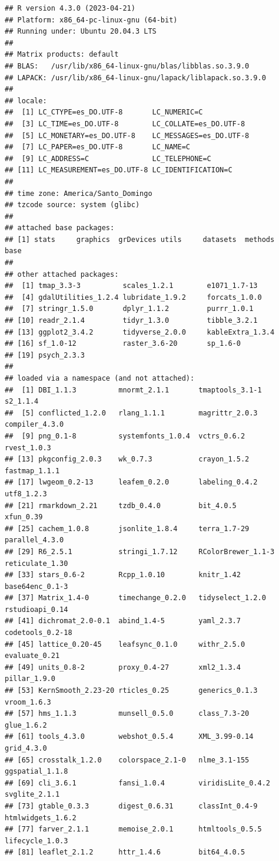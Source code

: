 \documentclass[spanish]{article}
\begin{document}
\begin{verbatim}
## R version 4.3.0 (2023-04-21)
## Platform: x86_64-pc-linux-gnu (64-bit)
## Running under: Ubuntu 20.04.3 LTS
## 
## Matrix products: default
## BLAS:   /usr/lib/x86_64-linux-gnu/blas/libblas.so.3.9.0 
## LAPACK: /usr/lib/x86_64-linux-gnu/lapack/liblapack.so.3.9.0
## 
## locale:
##  [1] LC_CTYPE=es_DO.UTF-8       LC_NUMERIC=C              
##  [3] LC_TIME=es_DO.UTF-8        LC_COLLATE=es_DO.UTF-8    
##  [5] LC_MONETARY=es_DO.UTF-8    LC_MESSAGES=es_DO.UTF-8   
##  [7] LC_PAPER=es_DO.UTF-8       LC_NAME=C                 
##  [9] LC_ADDRESS=C               LC_TELEPHONE=C            
## [11] LC_MEASUREMENT=es_DO.UTF-8 LC_IDENTIFICATION=C       
## 
## time zone: America/Santo_Domingo
## tzcode source: system (glibc)
## 
## attached base packages:
## [1] stats     graphics  grDevices utils     datasets  methods   base     
## 
## other attached packages:
##  [1] tmap_3.3-3          scales_1.2.1        e1071_1.7-13       
##  [4] gdalUtilities_1.2.4 lubridate_1.9.2     forcats_1.0.0      
##  [7] stringr_1.5.0       dplyr_1.1.2         purrr_1.0.1        
## [10] readr_2.1.4         tidyr_1.3.0         tibble_3.2.1       
## [13] ggplot2_3.4.2       tidyverse_2.0.0     kableExtra_1.3.4   
## [16] sf_1.0-12           raster_3.6-20       sp_1.6-0           
## [19] psych_2.3.3        
## 
## loaded via a namespace (and not attached):
##  [1] DBI_1.1.3          mnormt_2.1.1       tmaptools_3.1-1    s2_1.1.4          
##  [5] conflicted_1.2.0   rlang_1.1.1        magrittr_2.0.3     compiler_4.3.0    
##  [9] png_0.1-8          systemfonts_1.0.4  vctrs_0.6.2        rvest_1.0.3       
## [13] pkgconfig_2.0.3    wk_0.7.3           crayon_1.5.2       fastmap_1.1.1     
## [17] lwgeom_0.2-13      leafem_0.2.0       labeling_0.4.2     utf8_1.2.3        
## [21] rmarkdown_2.21     tzdb_0.4.0         bit_4.0.5          xfun_0.39         
## [25] cachem_1.0.8       jsonlite_1.8.4     terra_1.7-29       parallel_4.3.0    
## [29] R6_2.5.1           stringi_1.7.12     RColorBrewer_1.1-3 reticulate_1.30   
## [33] stars_0.6-2        Rcpp_1.0.10        knitr_1.42         base64enc_0.1-3   
## [37] Matrix_1.4-0       timechange_0.2.0   tidyselect_1.2.0   rstudioapi_0.14   
## [41] dichromat_2.0-0.1  abind_1.4-5        yaml_2.3.7         codetools_0.2-18  
## [45] lattice_0.20-45    leafsync_0.1.0     withr_2.5.0        evaluate_0.21     
## [49] units_0.8-2        proxy_0.4-27       xml2_1.3.4         pillar_1.9.0      
## [53] KernSmooth_2.23-20 rticles_0.25       generics_0.1.3     vroom_1.6.3       
## [57] hms_1.1.3          munsell_0.5.0      class_7.3-20       glue_1.6.2        
## [61] tools_4.3.0        webshot_0.5.4      XML_3.99-0.14      grid_4.3.0        
## [65] crosstalk_1.2.0    colorspace_2.1-0   nlme_3.1-155       ggspatial_1.1.8   
## [69] cli_3.6.1          fansi_1.0.4        viridisLite_0.4.2  svglite_2.1.1     
## [73] gtable_0.3.3       digest_0.6.31      classInt_0.4-9     htmlwidgets_1.6.2 
## [77] farver_2.1.1       memoise_2.0.1      htmltools_0.5.5    lifecycle_1.0.3   
## [81] leaflet_2.1.2      httr_1.4.6         bit64_4.0.5
\end{verbatim}
\end{document}
